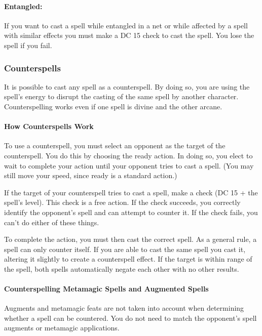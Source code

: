 \paragraph{Entangled:} If you want to cast a spell while entangled in a net or while affected by a spell with similar effects you must make a DC 15  check to cast the spell. You lose the spell if you fail.

\subsubsection{Counterspells}
\label{sec:Counterspells}
It is possible to cast any spell as a counterspell. 
By doing so, you are using the spell's energy to disrupt the casting of the same spell by another character. 
Counterspelling works even if one spell is divine and the other arcane.

\paragraph{How Counterspells Work}
To use a counterspell, you must select an opponent as the target of the counterspell. 
You do this by choosing the ready action. 
In doing so, you elect to wait to complete your action until your opponent tries to cast a spell. 
(You may still move your speed, since ready is a standard action.)

If the target of your counterspell tries to cast a spell, make a  check (DC 15 + the spell's level). 
This check is a free action. 
If the check succeeds, you correctly identify the opponent's spell and can attempt to counter it. 
If the check fails, you can't do either of these things.

To complete the action, you must then cast the correct spell.
As a general rule, a spell can only counter itself. 
If you are able to cast the same spell you cast it, altering it slightly to create a counterspell effect. 
If the target is within range of the spell, both spells automatically negate each other with no other results.

\paragraph{Counterspelling Metamagic Spells and Augmented Spells}
Augments and metamagic feats are not taken into account when determining whether a spell can be countered.
You do not need to match the opponent's spell augments or metamagic applications.

